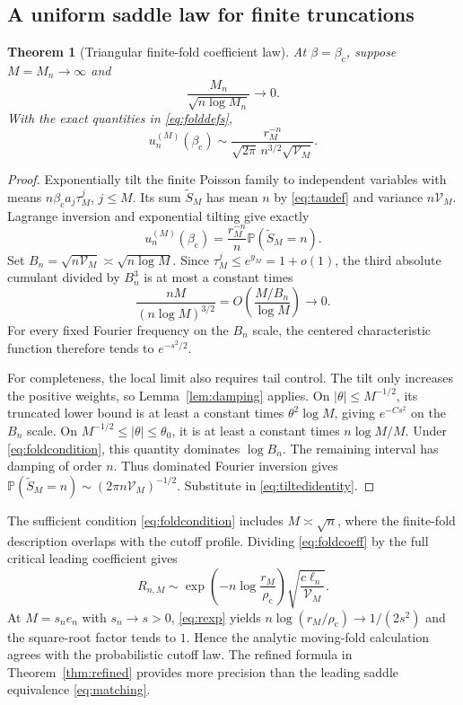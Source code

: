 \documentclass[11pt,a4paper]{article}
\numberwithin{equation}{section}
\newtheorem{theorem}{Theorem}[section]
\theoremstyle{definition}
\theoremstyle{remark}
\newcommand{\Prob}{\mathbb P}
\newcommand{\bc}{\beta_{\mathrm c}}
\newcommand{\rhoc}{\rho_{\mathrm c}}
\begin{document}
\subsection{A uniform saddle law for finite truncations}
\begin{theorem}[Triangular finite-fold coefficient law]
\label{thm:foldLLT}
At $\beta=\bc$, suppose $M=M_n\to\infty$ and
\begin{equation}\label{eq:foldcondition}
 \frac{M_n}{\sqrt{n\log M_n}}\longrightarrow0.
\end{equation}
With the \emph{exact} quantities in \eqref{eq:folddefs},
\begin{equation}\label{eq:foldcoeff}
 \boxed{\quad
 u_n^{(M)}(\bc)\sim
 \frac{r_M^{-n}}{\sqrt{2\pi}\,n^{3/2}\sqrt{\mathcal V_M}}.
 \quad}
\end{equation}
\end{theorem}
\begin{proof}
Exponentially tilt the finite Poisson family to independent variables
with means $n\bc a_j\tau_M^j$, $j\le M$. Its sum $\widetilde S_M$
has mean $n$ by \eqref{eq:taudef} and variance $n\mathcal V_M$.
Lagrange inversion and exponential tilting give exactly
\begin{equation}\label{eq:tiltedidentity}
 u_n^{(M)}(\bc)=\frac{r_M^{-n}}n\Prob(\widetilde S_M=n).
\end{equation}
Set $B_n=\sqrt{n\mathcal V_M}\asymp\sqrt{n\log M}$. Since
$\tau_M^j\le e^{y_M}=1+o(1)$, the third absolute cumulant divided by
$B_n^3$ is at most a constant times
\[
 \frac{nM}{(n\log M)^{3/2}}
 =O\left(\frac{M/B_n}{\log M}\right)\longrightarrow0.
\]
For every fixed Fourier frequency on the $B_n$ scale, the centered
characteristic function therefore tends to $e^{-s^2/2}$.

For completeness, the local limit also requires tail control. The tilt
only increases the positive weights, so
Lemma~\ref{lem:damping} applies. On $|\theta|\le M^{-1/2}$, its
truncated lower bound is at least a constant times
$\theta^2\log M$, giving $e^{-Cs^2}$ on the $B_n$ scale.
On $M^{-1/2}\le|\theta|\le\theta_0$, it is at least a constant
times $n\log M/M$. Under \eqref{eq:foldcondition}, this quantity
dominates $\log B_n$. The remaining interval has damping of order $n$.
Thus dominated Fourier inversion gives
$\Prob(\widetilde S_M=n)\sim(2\pi n\mathcal V_M)^{-1/2}$.
Substitute in \eqref{eq:tiltedidentity}.
\end{proof}

The sufficient condition \eqref{eq:foldcondition} includes $M\asymp
\sqrt n$, where the finite-fold description overlaps with the cutoff
profile. Dividing \eqref{eq:foldcoeff} by the full critical leading
coefficient gives
\begin{equation}\label{eq:matching}
 R_{n,M}\sim
 \exp\left(-n\log\frac{r_M}{\rhoc}\right)
       \sqrt{\frac{c\ell_n}{\mathcal V_M}}.
\end{equation}
At $M=s_ne_n$ with $s_n\to s>0$, \eqref{eq:rexp} yields
$n\log(r_M/\rhoc)\to1/(2s^2)$ and the square-root factor tends to
$1$. Hence the analytic moving-fold calculation agrees with the
probabilistic cutoff law. The refined formula in
Theorem~\ref{thm:refined} provides more precision than the leading
saddle equivalence \eqref{eq:matching}.
\end{document}
